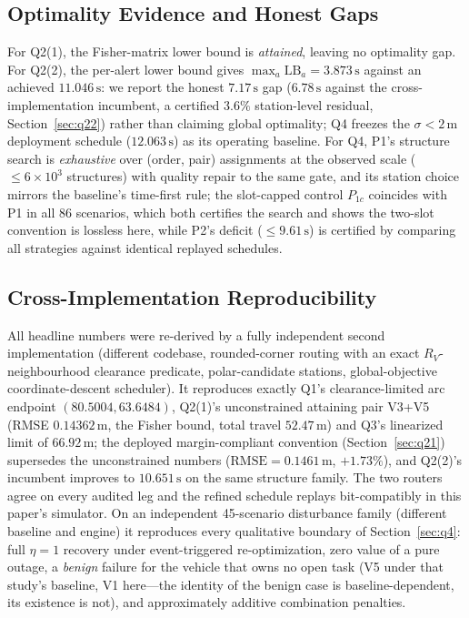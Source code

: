 \subsection{Optimality Evidence and Honest Gaps}

For Q2(1), the Fisher-matrix lower bound is \emph{attained}, leaving no optimality gap.
For Q2(2), the per-alert lower bound gives $\max_a \mathrm{LB}_a=3.873\,\mathrm{s}$
against an achieved $11.046\,\mathrm{s}$: we report the honest $7.17\,\mathrm{s}$ gap
($6.78\,\mathrm{s}$ against the cross-implementation incumbent, a certified $3.6\%$
station-level residual, Section~\ref{sec:q22}) rather than claiming global optimality;
Q4 freezes the $\sigma<2\,\mathrm{m}$ deployment schedule ($12.063\,\mathrm{s}$) as its
operating baseline. For Q4, P1's structure search is \emph{exhaustive} over
(order, pair) assignments at the observed scale ($\le6\times10^{3}$ structures) with
quality repair to the same gate, and its station choice mirrors the baseline's
time-first rule; the slot-capped control $P_{1c}$ coincides with P1 in all 86
scenarios, which both certifies the search and shows the two-slot convention is
lossless here, while P2's deficit ($\le9.61\,\mathrm{s}$) is certified by comparing
all strategies against identical replayed schedules.

\subsection{Cross-Implementation Reproducibility}

All headline numbers were re-derived by a fully independent second implementation
(different codebase, rounded-corner routing with an exact $R_V$-neighbourhood
clearance predicate, polar-candidate stations, global-objective coordinate-descent
scheduler). It reproduces exactly Q1's clearance-limited arc endpoint
$(80.5004,63.6484)$, Q2(1)'s unconstrained attaining pair V3+V5 (RMSE
$0.14362\,\mathrm{m}$, the Fisher bound, total travel $52.47\,\mathrm{m}$) and Q3's
linearized limit of $66.92\,\mathrm{m}$; the deployed margin-compliant convention
(Section~\ref{sec:q21}) supersedes the unconstrained numbers
($\mathrm{RMSE}=0.1461\,\mathrm{m}$, $+1.73\%$), and Q2(2)'s incumbent improves to
$10.651\,\mathrm{s}$ on the same structure family. The two routers agree on every
audited leg and the refined schedule replays bit-compatibly in this paper's simulator.
On an independent 45-scenario disturbance family (different baseline and engine) it
reproduces every qualitative boundary of Section~\ref{sec:q4}: full $\eta=1$ recovery
under event-triggered re-optimization, zero value of a pure outage, a \emph{benign}
failure for the vehicle that owns no open task (V5 under that study's baseline, V1
here---the identity of the benign case is baseline-dependent, its existence is not),
and approximately additive combination penalties.

